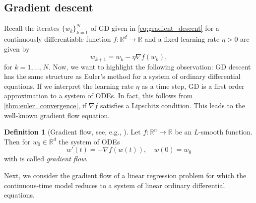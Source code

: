 \documentclass[12pt]{article}
\theoremstyle{definition}
\newtheorem{definition}[definition]{Definition}
\numberwithin{equation}{section}
\newcommand{\R}{\mathbb{R}}
\begin{document}
\subsection{Gradient descent}
\label{sec:gradient_flow}
Recall the iterates $\{ w_k\}_{k=1}^N$ of GD given in \eqref{eq:gradient_descent} for a continuously differentiable function $f : \R^d \rightarrow \R$ and a fixed learning rate $\eta > 0$ are given by
\begin{equation*}
  w_{k+1} = w_{k} - \eta \nabla f(w_{k}),
\end{equation*}
for $k=1,\dots,N$. Now, we want to highlight the following observation: GD descent has the same structure as Euler's method for a system of ordinary differential equations. If we interpret the learning rate $\eta$ as a time step, GD is a first order approximation to a system of ODEs. In fact, this follows from \autoref{thm:euler_convergence}, if $\nabla f$ satisfies a Lipschitz condition. This leads to the well-known gradient flow equation.
\begin{definition}[Gradient flow, see, e.g., ]
  Let $f : \R^n \rightarrow \R$ be an $L$-smooth function. Then for $w_0 \in \R^d$ the system of ODEs 
  \begin{equation}
  \label{eq:gradient_flow}
  w'(t) = - \nabla f(w(t)), \quad w(0) = w_0
  \end{equation}
  with is called \emph{gradient flow}.
\end{definition}
Next, we consider the gradient flow of a linear regression problem for which the continuous-time model reduces to a system of linear ordinary differential equations.
\end{document}
